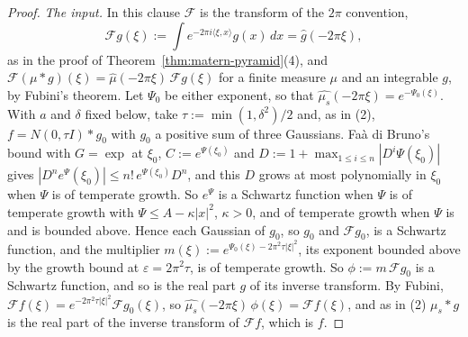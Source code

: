 \begin{proof}
\emph{The input.} In this clause
$\mathcal{F}$ is the transform of the $2\pi$ convention,
\[
\mathcal{F}g(\xi) := \int e^{-2\pi i\langle\xi, x\rangle}g(x)\,dx = \widehat g(-2\pi\xi),
\]
as in the proof of Theorem~\ref{thm:matern-pyramid}(4), and
$\mathcal{F}(\mu * g)(\xi) = \widehat\mu(-2\pi\xi)\,\mathcal{F}g(\xi)$ for a finite measure $\mu$ and
an integrable $g$, by Fubini's theorem. Let $\Psi_0$ be either
exponent, so that $\widehat{\mu_s}(-2\pi\xi) = e^{-\Psi_0(\xi)}$. With $a$ and $\delta$ fixed below,
take $\tau := \min(1, \delta^2)/2$ and, as in (2), $f = N(0, \tau I) * g_0$ with $g_0$ a positive
sum of three Gaussians. Faà di Bruno's bound with $G = \exp$ at $\xi_0$,
$C := e^{\Psi(\xi_0)}$ and $D := 1 + \max_{1 \le i \le n}|D^i\Psi(\xi_0)|$ gives
$|D^ne^\Psi(\xi_0)| \le n!\,e^{\Psi(\xi_0)}D^n$, and this $D$ grows at most polynomially in
$\xi_0$ when $\Psi$ is of temperate growth. So $e^\Psi$ is a Schwartz function when $\Psi$ is of
temperate growth with $\Psi \le A - \kappa|x|^2$, $\kappa > 0$, and of temperate growth when $\Psi$
is and is bounded above. Hence each Gaussian of
$g_0$, so $g_0$ and $\mathcal{F}g_0$, is a Schwartz function, and the multiplier
$m(\xi) := e^{\Psi_0(\xi) - 2\pi^2\tau|\xi|^2}$, its exponent bounded above by the growth bound at
$\varepsilon = 2\pi^2\tau$, is of temperate growth. So $\phi := m\,\mathcal{F}g_0$ is a Schwartz
function, and so is the real part $g$ of its inverse transform. By Fubini,
$\mathcal{F}f(\xi) = e^{-2\pi^2\tau|\xi|^2}\mathcal{F}g_0(\xi)$, so
$\widehat{\mu_s}(-2\pi\xi)\,\phi(\xi) = \mathcal{F}f(\xi)$, and as in (2) $\mu_s * g$ is the real
part of the inverse transform of $\mathcal{F}f$, which is $f$.

\end{proof}
